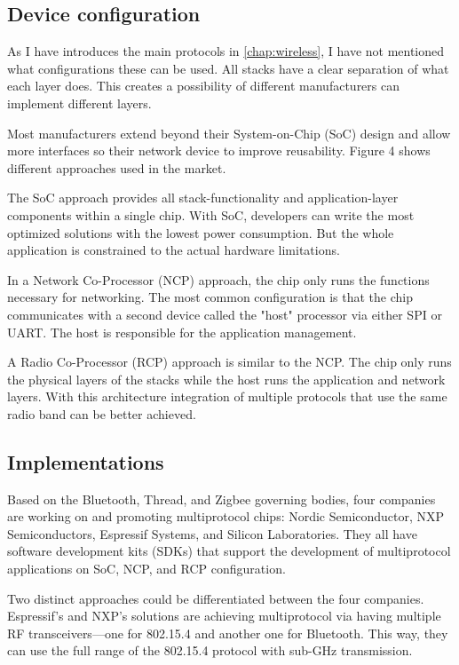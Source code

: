 \subsection{Device configuration}
\label{sec:multi:dc}
As I have introduces the main protocols in \autoref{chap:wireless}, I have not mentioned what configurations these can be used. All stacks have a clear separation of what each layer does. This creates a possibility of different manufacturers can implement different layers.

Most manufacturers extend beyond their System-on-Chip (SoC) design and allow more interfaces so their network device to improve reusability. Figure 4 shows different approaches used in the market.

The SoC approach provides all stack-functionality and application-layer components within a single chip. With SoC, developers can write the most optimized solutions with the lowest power consumption. But the whole application is constrained to the actual hardware limitations.

In a Network Co-Processor (NCP) approach, the chip only runs the functions necessary for networking. The most common configuration is that the chip communicates with a second device called the "host" processor via either SPI or UART. The host is responsible for the application management.

A Radio Co-Processor (RCP) approach is similar to the NCP. The chip only runs the physical layers of the stacks while the host runs the application and network layers. With this architecture integration of multiple protocols that use the same radio band can be better achieved.

\subsection{Implementations}
\label{sec:multi:imp}
Based on the Bluetooth, Thread, and Zigbee governing bodies\cite{bt_members:2023, csa_members:2023, thread_members:2023}, four companies are working on and promoting multiprotocol chips: Nordic Semiconductor, NXP Semiconductors, Espressif Systems, and Silicon Laboratories. They all have software development kits (SDKs) that support the development of multiprotocol applications on SoC, NCP, and RCP configuration.

Two distinct approaches could be differentiated between the four companies. Espressif's and NXP's solutions are achieving multiprotocol via having multiple RF transceivers—one for 802.15.4 and another one for Bluetooth. This way, they can use the full range of the 802.15.4 protocol with sub-GHz transmission.

